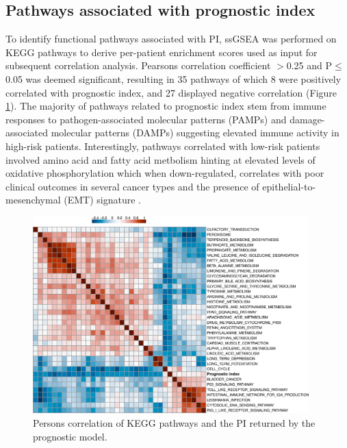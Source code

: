 \documentclass[twocolumn]{bmcart}%
\begin{document}
\subsection*{\textbf{Pathways associated with prognostic index}}
To identify functional pathways associated with PI, ssGSEA was performed on KEGG pathways to derive per-patient enrichment scores used as input for subsequent correlation analysis. Pearsons correlation coefficient $>$0.25 and P$\leq$0.05 was deemed significant, resulting in 35 pathways of which 8 were positively correlated with prognostic index, and 27 displayed negative correlation (Figure \ref{fig:kegg_cor}). The majority of pathways related to prognostic index stem from immune responses to pathogen-associated molecular patterns (PAMPs) and damage-associated molecular patterns (DAMPs) suggesting elevated immune activity in high-risk patients. Interestingly, pathways correlated with low-risk patients involved amino acid and fatty acid metbolism hinting at elevated levels of oxidative phosphorylation which when down-regulated, correlates with poor clinical outcomes in several cancer types and the presence of epithelial-to-mesenchymal (EMT) signature \cite{Ahmad2021Oct}.

\begin{figure}[h!]
    \includegraphics[width=0.95\textwidth]{figures/KEGG_corr.png}
    \caption{Persons correlation of KEGG pathways and the PI returned by the prognostic model.}
    \label{fig:kegg_cor}
\end{figure}
\end{document}
